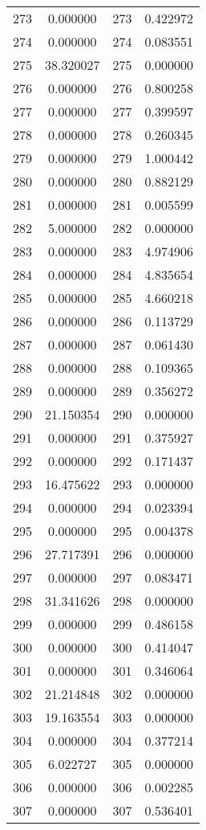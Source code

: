 \documentclass[12pt]{article}
\begin{document}
\begin{longtable}{@{}cccc@{}}
273 & 0.000000 & 273 & 0.422972 \\
274 & 0.000000 & 274 & 0.083551 \\
275 & 38.320027 & 275 & 0.000000 \\
276 & 0.000000 & 276 & 0.800258 \\
277 & 0.000000 & 277 & 0.399597 \\
278 & 0.000000 & 278 & 0.260345 \\
279 & 0.000000 & 279 & 1.000442 \\
280 & 0.000000 & 280 & 0.882129 \\
281 & 0.000000 & 281 & 0.005599 \\
282 & 5.000000 & 282 & 0.000000 \\
283 & 0.000000 & 283 & 4.974906 \\
284 & 0.000000 & 284 & 4.835654 \\
285 & 0.000000 & 285 & 4.660218 \\
286 & 0.000000 & 286 & 0.113729 \\
287 & 0.000000 & 287 & 0.061430 \\
288 & 0.000000 & 288 & 0.109365 \\
289 & 0.000000 & 289 & 0.356272 \\
290 & 21.150354 & 290 & 0.000000 \\
291 & 0.000000 & 291 & 0.375927 \\
292 & 0.000000 & 292 & 0.171437 \\
293 & 16.475622 & 293 & 0.000000 \\
294 & 0.000000 & 294 & 0.023394 \\
295 & 0.000000 & 295 & 0.004378 \\
296 & 27.717391 & 296 & 0.000000 \\
297 & 0.000000 & 297 & 0.083471 \\
298 & 31.341626 & 298 & 0.000000 \\
299 & 0.000000 & 299 & 0.486158 \\
300 & 0.000000 & 300 & 0.414047 \\
301 & 0.000000 & 301 & 0.346064 \\
302 & 21.214848 & 302 & 0.000000 \\
303 & 19.163554 & 303 & 0.000000 \\
304 & 0.000000 & 304 & 0.377214 \\
305 & 6.022727 & 305 & 0.000000 \\
306 & 0.000000 & 306 & 0.002285 \\
307 & 0.000000 & 307 & 0.536401 \\

\end{longtable}
\end{document}
